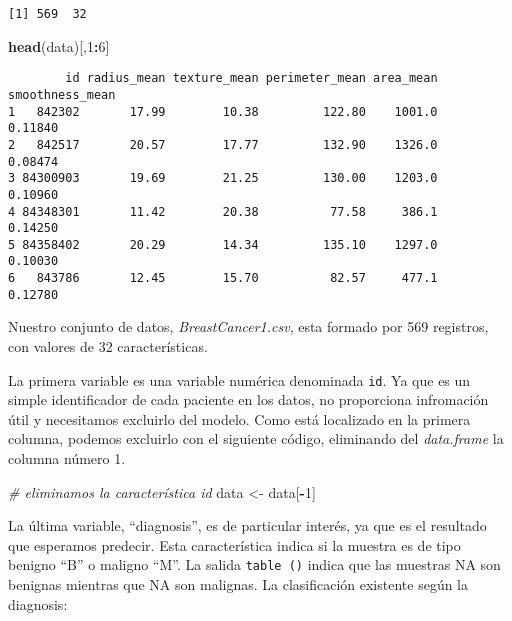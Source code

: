 \documentclass[
]{article}
\newenvironment{Shaded}{\begin{snugshade}}{\end{snugshade}}
\newcommand{\CommentTok}[1]{\textcolor[rgb]{0.56,0.35,0.01}{\textit{#1}}}
\newcommand{\DecValTok}[1]{\textcolor[rgb]{0.00,0.00,0.81}{#1}}
\newcommand{\KeywordTok}[1]{\textcolor[rgb]{0.13,0.29,0.53}{\textbf{#1}}}
\newcommand{\NormalTok}[1]{#1}
\newcommand{\OperatorTok}[1]{\textcolor[rgb]{0.81,0.36,0.00}{\textbf{#1}}}
\newcommand{\StringTok}[1]{\textcolor[rgb]{0.31,0.60,0.02}{#1}}
\begin{document}
\begin{verbatim}
[1] 569  32
\end{verbatim}

\begin{Shaded}
\begin{Highlighting}[]
\KeywordTok{head}\NormalTok{(data)[,}\DecValTok{1}\OperatorTok{:}\DecValTok{6}\NormalTok{]}
\end{Highlighting}
\end{Shaded}

\begin{verbatim}
        id radius_mean texture_mean perimeter_mean area_mean smoothness_mean
1   842302       17.99        10.38         122.80    1001.0         0.11840
2   842517       20.57        17.77         132.90    1326.0         0.08474
3 84300903       19.69        21.25         130.00    1203.0         0.10960
4 84348301       11.42        20.38          77.58     386.1         0.14250
5 84358402       20.29        14.34         135.10    1297.0         0.10030
6   843786       12.45        15.70          82.57     477.1         0.12780
\end{verbatim}

Nuestro conjunto de datos, \emph{BreastCancer1.csv}, esta formado por
569 registros, con valores de 32 características.

La primera variable es una variable numérica denominada \texttt{id}. Ya
que es un simple identificador de cada paciente en los datos, no
proporciona infromación útil y necesitamos excluirlo del modelo. Como
está localizado en la primera columna, podemos excluirlo con el
siguiente código, eliminando del \emph{data.frame} la columna número 1.

\begin{Shaded}
\begin{Highlighting}[]
\CommentTok{# eliminamos la característica id}
\NormalTok{data <-}\StringTok{ }\NormalTok{data[}\OperatorTok{-}\DecValTok{1}\NormalTok{]}
\end{Highlighting}
\end{Shaded}

La última variable, ``diagnosis'', es de particular interés, ya que es
el resultado que esperamos predecir. Esta característica indica si la
muestra es de tipo benigno ``B'' o maligno ``M''. La salida
\texttt{table\ ()} indica que las muestras NA son benignas mientras que
NA son malignas. La clasificación existente según la diagnosis:

\begin{Shaded}
\end{Shaded}
\end{document}
